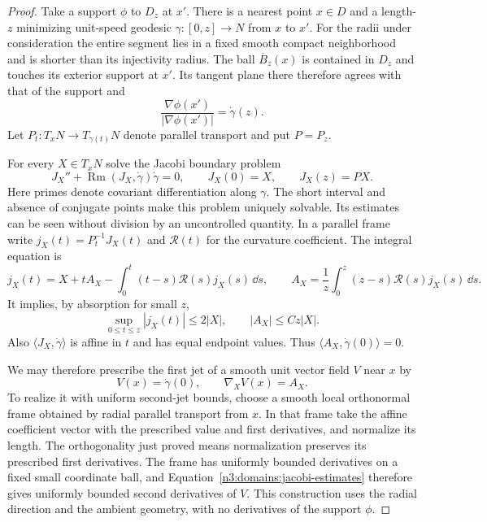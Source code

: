 \begin{proof}
Take a support $\phi$ to $D_z$ at $x'$.  There is a nearest point
$x\in D$ and a length-$z$ minimizing unit-speed geodesic
$\gamma:[0,z]\to N$ from $x$ to $x'$.  For the radii under
consideration the entire segment lies in a fixed smooth compact
neighborhood and is shorter than its injectivity radius.  The ball
$\overline B_z(x)$ is contained in $D_z$ and touches its exterior
support at $x'$.  Its tangent plane there therefore agrees with that
of the support and
\begin{equation}\label{n3:domains:radial-normal}
 \frac{\nabla\phi(x')}{|\nabla\phi(x')|}=\dot\gamma(z).
\end{equation}
Let $P_t:T_xN\to T_{\gamma(t)}N$ denote parallel transport and put
$P=P_z$.

For every $X\in T_xN$ solve the Jacobi boundary problem
\begin{equation}\label{n3:domains:jacobi-endpoints}
 J_X''+\operatorname{Rm}(J_X,\dot\gamma)\dot\gamma=0,
 \qquad J_X(0)=X,\qquad J_X(z)=PX.
\end{equation}
Here primes denote covariant differentiation along $\gamma$.
The short interval and absence of conjugate points make this problem
uniquely solvable.  Its estimates can be seen without division by an
uncontrolled quantity.  In a parallel frame write
$j_X(t)=P_t^{-1}J_X(t)$ and $\mathcal R(t)$ for the curvature
coefficient.  The integral equation is
\[
 j_X(t)=X+tA_X-
       \int_0^t(t-s)\mathcal R(s)j_X(s)\,\dd s,
 \qquad
 A_X=\frac1z\int_0^z(z-s)\mathcal R(s)j_X(s)\,\dd s.
\]
It implies, by absorption for small $z$,
\begin{equation}\label{n3:domains:jacobi-estimates}
 \sup_{0\leq t\leq z}|j_X(t)|\leq2|X|,
 \qquad |A_X|\leq Cz|X|.
\end{equation}
Also $\langle J_X,\dot\gamma\rangle$ is affine in $t$ and has
equal endpoint values.  Thus
$\langle A_X,\dot\gamma(0)\rangle=0$.

We may therefore prescribe the first jet of a smooth unit vector
field $V$ near $x$ by
\[
 V(x)=\dot\gamma(0),\qquad \nabla_XV(x)=A_X.
\]
To realize it with uniform second-jet bounds, choose a smooth local
orthonormal frame obtained by radial parallel transport from $x$.
In that frame take the affine coefficient vector with the prescribed
value and first derivatives, and normalize its length.  The
orthogonality just proved means normalization preserves its prescribed
first derivatives.  The frame has uniformly bounded derivatives on
a fixed small coordinate ball, and Equation~\eqref{n3:domains:jacobi-estimates}
therefore gives uniformly bounded second derivatives of $V$.
This construction uses the radial direction and the ambient
geometry, with no derivatives of the support $\phi$.


\end{proof}
